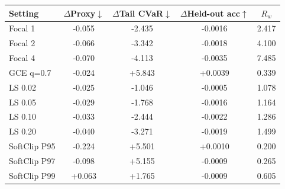 \begin{tabular}{lcccc}
  \toprule
  Setting & $\Delta$Proxy$\downarrow$ & $\Delta$Tail CVaR$\downarrow$ & $\Delta$Held-out acc$\uparrow$ & $R_w$ \\
  \midrule
  Focal 1 & -0.055 & -2.435 & -0.0016 & 2.417 \\
  Focal 2 & -0.066 & -3.342 & -0.0018 & 4.100 \\
  Focal 4 & -0.070 & -4.113 & -0.0035 & 7.485 \\
  GCE q=0.7 & -0.024 & +5.843 & +0.0039 & 0.339 \\
  LS 0.02 & -0.025 & -1.046 & -0.0005 & 1.078 \\
  LS 0.05 & -0.029 & -1.768 & -0.0016 & 1.164 \\
  LS 0.10 & -0.033 & -2.444 & -0.0022 & 1.286 \\
  LS 0.20 & -0.040 & -3.271 & -0.0019 & 1.499 \\
  SoftClip P95 & -0.224 & +5.501 & +0.0010 & 0.200 \\
  SoftClip P97 & -0.098 & +5.155 & -0.0009 & 0.265 \\
  SoftClip P99 & +0.063 & +1.765 & -0.0009 & 0.605 \\
  \bottomrule
\end{tabular}
